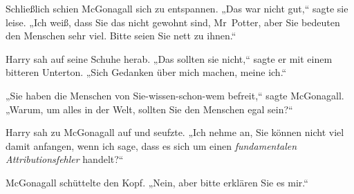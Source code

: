 Schließlich schien McGonagall sich zu entspannen. „Das war nicht gut,“ sagte sie leise. „Ich weiß, dass Sie das nicht gewohnt sind, Mr~Potter, aber Sie bedeuten den Menschen sehr viel. Bitte seien Sie nett zu ihnen.“

Harry sah auf seine Schuhe herab. „Das sollten sie nicht,“ sagte er mit einem bitteren Unterton. „Sich Gedanken über mich machen, meine ich.“

„Sie haben die Menschen von Sie-wissen-schon-wem befreit,“ sagte McGonagall. „Warum, um alles in der Welt, sollten Sie den Menschen egal sein?“

Harry sah zu McGonagall auf und seufzte. „Ich nehme an, Sie können nicht viel damit anfangen, wenn ich sage, dass es sich um einen \emph{fundamentalen Attributionsfehler} handelt?“

McGonagall schüttelte den Kopf. „Nein, aber bitte erklären Sie es mir.“

